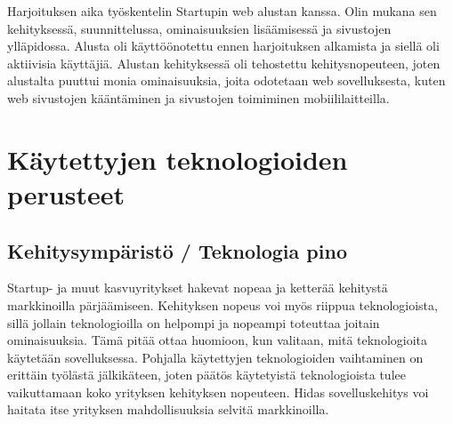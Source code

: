 \documentclass[11pt,a4paper,titlepage,oneside]{article}
\begin{document}
Harjoituksen aika työskentelin Startupin web alustan kanssa. 
Olin mukana sen kehityksessä, suunnittelussa, ominaisuuksien lisäämisessä ja sivustojen ylläpidossa.
Alusta oli käyttöönotettu ennen harjoituksen alkamista ja siellä oli aktiivisia käyttäjiä.
Alustan kehityksessä oli tehostettu kehitysnopeuteen,
joten alustalta puuttui monia ominaisuuksia, joita odotetaan web sovelluksesta, 
kuten web sivustojen kääntäminen ja sivustojen toimiminen mobiililaitteilla.
\medskip

























\newpage
\section{Käytettyjen teknologioiden perusteet}                %



\subsection{Kehitysympäristö / Teknologia pino}



Startup- ja muut kasvuyritykset hakevat nopeaa ja ketterää kehitystä markkinoilla pärjäämiseen.
Kehityksen nopeus voi myös riippua teknologioista, sillä jollain teknologioilla on helpompi ja nopeampi toteuttaa joitain ominaisuuksia.
Tämä pitää ottaa huomioon, kun valitaan, mitä teknologioita käytetään sovelluksessa.
Pohjalla käytettyjen teknologioiden vaihtaminen on erittäin työlästä jälkikäteen,
joten päätös käytetyistä teknologioista tulee vaikuttamaan koko yrityksen kehityksen nopeuteen.
Hidas sovelluskehitys voi haitata itse yrityksen mahdollisuuksia selvitä markkinoilla.
\medskip
\end{document}
